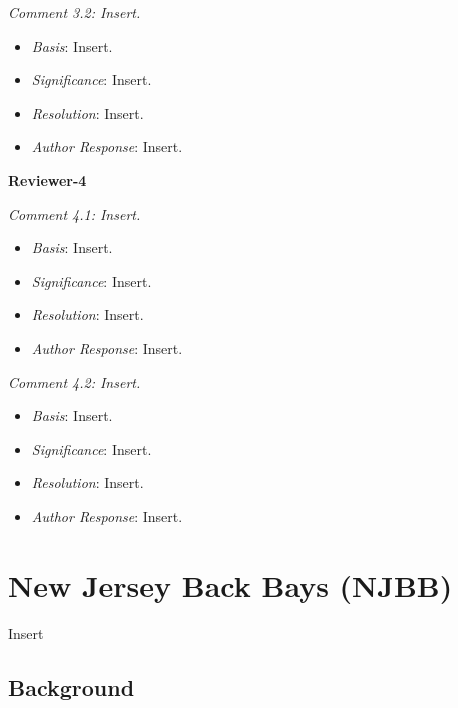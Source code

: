 \documentclass[
]{book}
\providecommand{\tightlist}{%
  \setlength{\itemsep}{0pt}\setlength{\parskip}{0pt}}
\begin{document}
\emph{Comment 3.2: Insert.}

\begin{itemize}
\tightlist
\item
  \emph{Basis}: Insert.\\
\item
  \emph{Significance}: Insert.\\
\item
  \emph{Resolution}: Insert.\\
\item
  \emph{Author Response}: Insert.
\end{itemize}

\textbf{Reviewer-4}

\emph{Comment 4.1: Insert.}

\begin{itemize}
\tightlist
\item
  \emph{Basis}: Insert.\\
\item
  \emph{Significance}: Insert.\\
\item
  \emph{Resolution}: Insert.\\
\item
  \emph{Author Response}: Insert.
\end{itemize}

\emph{Comment 4.2: Insert.}

\begin{itemize}
\tightlist
\item
  \emph{Basis}: Insert.\\
\item
  \emph{Significance}: Insert.\\
\item
  \emph{Resolution}: Insert.\\
\item
  \emph{Author Response}: Insert.
\end{itemize}

\hypertarget{new-jersey-back-bays-njbb}{%
\chapter{New Jersey Back Bays (NJBB)}\label{new-jersey-back-bays-njbb}}

Insert

\hypertarget{background-1}{%
\section{Background}\label{background-1}}
\end{document}
